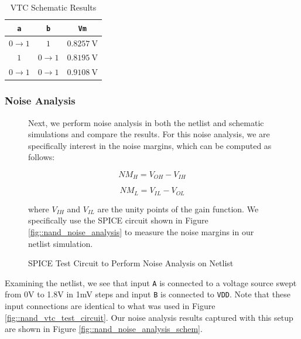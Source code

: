\documentclass{article}
\begin{document}
	\begin{table}[H]
	\begin{center}
	\caption{VTC Schematic Results}
	\label{table::vtc_schematic}
	\begin{tabular}{| c | c | c |}
		\hline
		\texttt{a} & \texttt{b} & \texttt{Vm}\\
		\hline	
		$0 \rightarrow 1$ & $1$ & $0.8257\ \text{V}$\\
		\hline	
		$1$ & $0 \rightarrow 1$ & $0.8195\ \text{V}$\\
		\hline	
		$0 \rightarrow 1$ & $0 \rightarrow 1$ & $0.9108\ \text{V}$\\
		\hline
	\end{tabular}
	\end{center}
	\end{table}
	
	\subsubsection{Noise Analysis}
	\begin{figure}[H]
	
	Next, we perform noise analysis in both the netlist and schematic simulations and compare the results. For this noise analysis, we are specifically interest in the noise margins, which can be computed as follows:
	
	\begin{equation}
		NM_H = V_{OH} - V_{IH}
	\end{equation}
	
	 \begin{equation}
		NM_L = V_{IL} - V_{OL}
	\end{equation}
	
	\noindent where $V_{IH}$ and $V_{IL}$ are the unity points of the gain function. We specifically use the SPICE circuit shown in Figure \ref{fig::nand_noise_analysis} to measure the noise margins in our netlist simulation.
		
		\caption{SPICE Test Circuit to Perform Noise Analysis on Netlist}
		\label{fig::nand_noise_analysis_test_circuit}
	\end{figure}
	
	Examining the netlist, we see that input \texttt{A} is connected to a voltage source swept from 0V to 1.8V in 1mV steps and input \texttt{B} is connected to \texttt{VDD}. Note that these input connections are identical to what was used in Figure \ref{fig::nand_vtc_test_circuit}. Our noise analysis results captured with this setup are shown in Figure \ref{fig::nand_noise_analysis_schem}.
	
\end{document}
